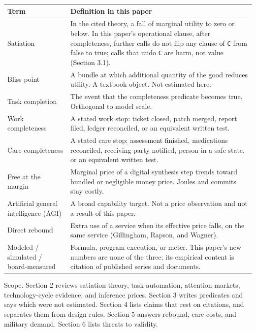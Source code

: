 \documentclass[
  10pt,
]{article}
\newcounter{none} %
\begin{document}
{\def\LTcaptype{none} %
\begin{longtable}[]{@{}
  >{\raggedright\arraybackslash}p{}
  >{\raggedright\arraybackslash}p{}@{}}
\toprule\noalign{}
\begin{minipage}[b]{\linewidth}\raggedright
Term
\end{minipage} & \begin{minipage}[b]{\linewidth}\raggedright
Definition in this paper
\end{minipage} \\
\midrule\noalign{}
\endhead
\bottomrule\noalign{}
\endlastfoot
Satiation & In the cited theory, a fall of marginal utility to zero or
below. In this paper's operational clause, after completeness, further
calls do not flip any clause of \texttt{C} from false to true; calls
that undo \texttt{C} are harm, not value (Section 3.1). \\
Bliss point & A bundle at which additional quantity of the good reduces
utility. A textbook object. Not estimated here. \\
Task completion & The event that the completeness predicate becomes
true. Orthogonal to model scale. \\
Work completeness & A stated work stop: ticket closed, patch merged,
report filed, ledger reconciled, or an equivalent written test. \\
Care completeness & A stated care stop: assessment finished, medications
reconciled, receiving party notified, person in a safe state, or an
equivalent written test. \\
Free at the margin & Marginal price of a digital synthesis step trends
toward bundled or negligible money price. Joules and commits stay
costly. \\
Artificial general intelligence (AGI) & A broad capability target. Not a
price observation and not a result of this paper. \\
Direct rebound & Extra use of a service when its effective price falls,
on the same service (Gillingham, Rapson, and Wagner). \\
Modeled / simulated / board-measured & Formula, program execution, or
meter. This paper's new numbers are none of the three; its empirical
content is citation of published series and documents. \\
\end{longtable}
}

Scope. Section 2 reviews satiation theory, task automation, attention
markets, technology-cycle evidence, and inference prices. Section 3
writes predicates and says which were not estimated. Section 4 lists
claims that rest on citations, and separates them from design rules.
Section 5 answers rebound, care costs, and military demand. Section 6
lists threats to validity.
\end{document}
